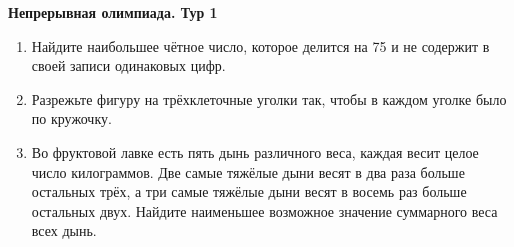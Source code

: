 \begin{center}
    {\large\bfseries Непрерывная олимпиада. Тур 1}
\end{center}

\footnotesize

\begin{enumerate}

    \item Найдите наибольшее чётное число,
которое делится на 75 и не содержит в
своей записи одинаковых цифр.

\item
\begin{minipage}[c]{0.52\linewidth}
Разрежьте фигуру на трёхклеточные уголки так, чтобы в каждом уголке было
по кружочку.
\end{minipage}\hfill
\begin{minipage}[c]{0.43\linewidth}
\centering
{}
\end{minipage}

\item Во фруктовой лавке есть пять дынь
различного веса, каждая весит целое
число килограммов. Две самые тяжёлые
дыни весят в два раза больше остальных
трёх, а три самые тяжёлые дыни весят в
восемь раз больше остальных двух.
Найдите наименьшее возможное
значение суммарного веса всех дынь.

\end{enumerate}
